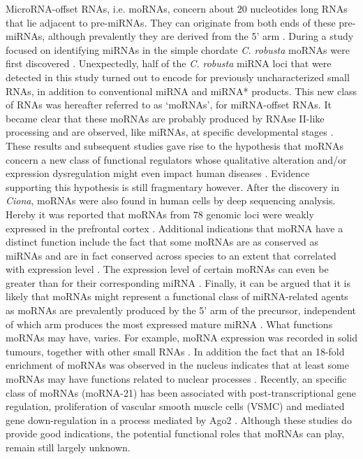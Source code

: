 \documentclass[graybox]{svmult}
\begin{document}
MicroRNA-offset RNAs, i.e. moRNAs, concern about $20$ nucleotides long RNAs 
that lie adjacent to pre-miRNAs. They can originate from both ends of these 
pre-miRNAs, although prevalently they are derived from the 5' arm 
\cite{bortoluzzi2011}. During a study focused on identifying miRNAs in the 
simple chordate \textit{C. robusta} moRNAs were first discovered 
\cite{Shi2009}. Unexpectedly, half of the \textit{C. robusta} miRNA loci 
that were detected in this study turned out to encode for 
previously uncharacterized small RNAs, in addition to conventional miRNA and 
miRNA* products. This new class of RNAs was hereafter referred to as `moRNAs', 
for miRNA-offset RNAs. It became clear that these moRNAs are probably produced 
by RNAse II-like processing and are observed, like miRNAs, at specific 
developmental stages \cite{Shi2009}.
These results and subsequent studies gave rise to the hypothesis that moRNAs 
concern  a new class of functional regulators whose qualitative alteration 
and/or expression dysregulation might even impact human diseases 
\cite{bortoluzzi2011}. Evidence supporting this hypothesis is still fragmentary 
however. After the discovery in \textit{Ciona}, moRNAs were 
also found in human cells by deep sequencing analysis. Hereby it was reported 
that moRNAs from $78$ genomic loci were weakly expressed in the prefrontal 
cortex \cite{Langenberger2009}. Additional indications that moRNA have a 
distinct function include the fact that some moRNAs are as conserved as miRNAs 
and are in fact conserved across species to an extent that correlated with 
expression level \cite{Shi2009}. The expression level of certain moRNAs can 
even be greater than for their corresponding miRNA \cite{Umbach2010}. Finally, 
it can be argued \cite{bortoluzzi2011} that it is likely that moRNAs might 
represent a functional class of miRNA-related agents as moRNAs are prevalently 
produced by the 5' arm of the precursor, independent of which arm produces the 
most expressed mature miRNA \cite{Langenberger2009, Umbach2010}. 
What functions moRNAs may have, varies. For example, moRNA expression was 
recorded in solid tumours, together with other small RNAs \cite{Meiri2010}. 
In addition the fact that an 18-fold enrichment of moRNAs was observed in the 
nucleus \cite{Taft2010} indicates that at least some moRNAs may have functions 
related to nuclear processes \cite{bortoluzzi2011}. Recently, an specific class 
of moRNAs (moRNA-21) has been associated with post-transcriptional gene 
regulation, proliferation of vascular smooth muscle cells (VSMC) and mediated 
gene down-regulation in a process mediated by Ago2 \cite{Zhao2016}. Although 
these studies do provide good indications, the potential functional roles that 
moRNAs can play, remain still largely unknown.
\end{document}

